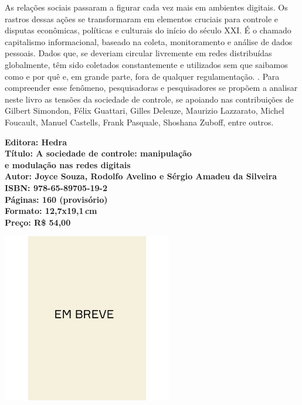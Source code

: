 \hspace*{-7cm}\hrulefill\hspace*{-7cm}

\medskip

\noindent{}As relações sociais passaram a figurar cada vez mais em ambientes digitais. Os rastros dessas ações se transformaram em elementos cruciais para controle e disputas econômicas, políticas e culturais do início do século XXI. É o chamado capitalismo informacional, baseado na coleta, monitoramento e análise de dados pessoais. Dados que, se deveriam circular livremente em redes distribuídas globalmente, têm sido coletados constantemente e utilizados sem que saibamos como e por quê e, em grande parte, fora de qualquer regulamentação. . Para compreender esse fenômeno, pesquisadoras e pesquisadores se propõem a analisar neste livro as tensões da sociedade de controle, se apoiando nas contribuições de Gilbert Simondon, Félix Guattari, Gilles Deleuze, Maurizio Lazzarato, Michel Foucault, Manuel Castells, Frank Pasquale, Shoshana Zuboff, entre outros.

\vfill

\noindent\begin{minipage}[c]{1\linewidth}
{\small\textbf{
\hspace*{-.1cm}Editora: Hedra\\
Título: A sociedade de controle: manipulação\\ e modulação nas redes digitais\\
Autor: Joyce Souza, Rodolfo Avelino e Sérgio Amadeu da Silveira\\ 
ISBN: 978-65-89705-19-2\\
Páginas: 160 (provisório)\\
Formato: 12,7x19,1\,cm\\
Preço: R\$ 54,00\\
}}
\end{minipage}

\pagebreak

\begin{center}
\hspace*{.5cm}\includegraphics[width=74mm]{./CAPAS/breve.jpeg}
\end{center}


